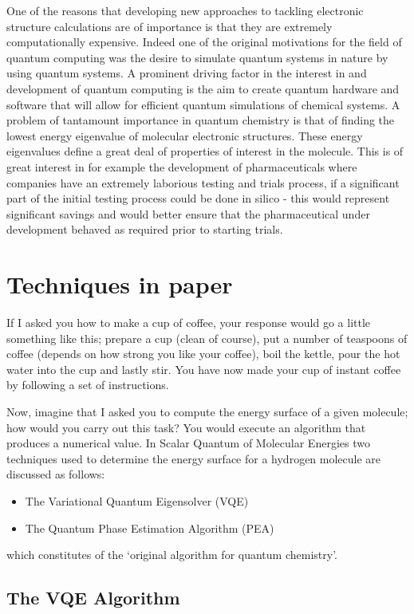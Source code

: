\documentclass[12pt]{article}
\begin{document}
One of the reasons that developing new approaches to tackling electronic structure calculations are of importance is that they are extremely
computationally expensive. Indeed one of the original motivations for the field of quantum computing was the desire to simulate quantum systems
 in nature by using quantum systems. A prominent driving factor in the interest in and development of quantum computing is the aim to create quantum
  hardware and software that will allow for efficient quantum simulations of chemical systems. A problem of tantamount importance in quantum chemistry
  is that of finding the lowest energy eigenvalue of molecular electronic structures. These energy eigenvalues define a great deal of properties of
  interest in the molecule. This is of great interest in for example the development of pharmaceuticals where companies have an extremely laborious
  testing and trials process, if a significant part of the initial testing process could be done in silico - this would represent significant savings
  and would better ensure that the pharmaceutical under development behaved as required prior to starting trials.
\section{Techniques in paper}
If I asked you how to make a cup of coffee, your response would go a little something like this; prepare a cup (clean of course), put a number of teaspoons of coffee (depends on how strong you like your coffee), boil the kettle, pour the hot water into the cup and lastly stir. You have now made your cup of instant coffee by following a set of instructions.

Now, imagine that I asked you to compute the energy surface of a given molecule; how would you carry out this task? You would execute an algorithm that produces a numerical value. In Scalar Quantum of Molecular Energies two techniques used to determine the energy surface for a hydrogen molecule are discussed as follows:
\begin{itemize}
\item The Variational Quantum Eigensolver (VQE)
\item The Quantum Phase Estimation Algorithm (PEA)
\end{itemize}
which constitutes of the ‘original algorithm for quantum chemistry’.

\subsection{The VQE Algorithm}
\end{document}
